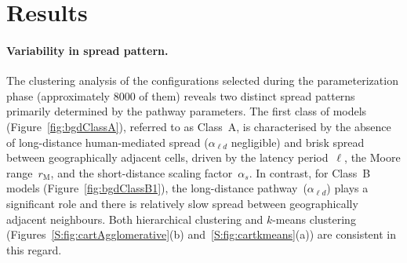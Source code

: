 \documentclass[11pt]{article}
\newcommand{\asd}{\alpha_s}
\newcommand{\ald}{\alpha_{\ell d}}
\newcommand{\mooreRange}{r_\mathrm{M}}
\theoremstyle{definition}
\begin{document}
\section{Results}
\paragraph{Variability in spread pattern.} The clustering analysis of the
configurations selected during the parameterization phase (approximately
8000 of them) reveals two distinct spread patterns primarily determined by
the pathway parameters.  The first class of models
(Figure~\ref{fig:bgdClassA}), referred to as Class~A, is characterised by
the absence of long-distance human-mediated spread ($\ald$ negligible) and
brisk spread between geographically adjacent cells, driven by the latency
period~$\ell$, the Moore range~$\mooreRange$, and the short-distance scaling
factor~$\asd$. In contrast, for Class~B models
(Figure~\ref{fig:bgdClassB1}), the long-distance pathway~($\ald$) plays a
significant role  and there is relatively slow spread between
geographically adjacent neighbours. Both hierarchical clustering and
$k$-means clustering (Figures~\ref{S:fig:cartAgglomerative}(b)
and~\ref{S:fig:cartkmeans}(a)) are consistent in this regard.
\end{document}
